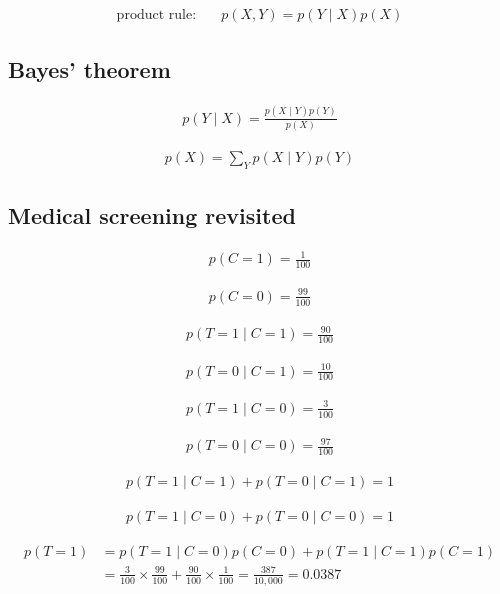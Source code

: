 \documentclass{article}
\begin{document}
\begin{align*}
\text{product rule:} \quad & p(X, Y)=p(Y \mid X) p(X)
\tag{2.9}
\end{align*}

\subsection{Bayes' theorem}

\begin{align*}
p(Y \mid X)=\frac{p(X \mid Y) p(Y)}{p(X)}
\tag{2.10}
\end{align*}

\begin{align*}
p(X)=\sum_{Y} p(X \mid Y) p(Y)
\tag{2.11}
\end{align*}

\subsection{Medical screening revisited}

\begin{align*}
p(C=1)=\frac{1}{100}
\tag{2.12}
\end{align*}

\begin{align*}
p(C=0)=\frac{99}{100}
\tag{2.13}
\end{align*}

\begin{align*}
p(T=1 \mid C=1) = \frac{90}{100}
\tag{2.14}
\end{align*}

\begin{align*}
p(T=0 \mid C=1) = \frac{10}{100}
\tag{2.15}
\end{align*}

\begin{align*}
p(T=1 \mid C=0) = \frac{3}{100}
\tag{2.16}
\end{align*}

\begin{align*}
p(T=0 \mid C=0) = \frac{97}{100}
\tag{2.17}
\end{align*}

\begin{align*}
p(T=1 \mid C=1)+p(T=0 \mid C=1)=1
\tag{2.18}
\end{align*}

\begin{align*}
p(T=1 \mid C=0)+p(T=0 \mid C=0)=1
\tag{2.19}
\end{align*}

\begin{align*}
p(T=1) & =p(T=1 \mid C=0) p(C=0)+p(T=1 \mid C=1) p(C=1) \\
& =\frac{3}{100} \times \frac{99}{100} + \frac{90}{100} \times \frac{1}{100}=\frac{387}{10,000}=0.0387
\tag{2.20}
\end{align*}
\end{document}
